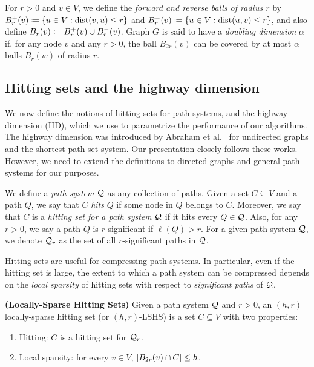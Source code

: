 For $r>0$ and $v\in V$, we define the \emph{forward and reverse balls of radius $r$} by $\Bf_r(v)\defeq\{u\in V: \dist(v,u)\leq r\}$ and $\Bb_r(v)\defeq\{u\in V: \dist(u,v)\leq r\}$, and also define $B_r(v)\defeq\Bf_r(v)\cup\Bb_r(v)$.
Graph $G$ is said to have a \emph{doubling dimension} $\alpha$ if, for any node $v$ and any $r>0$, the ball $B_{2r}(v)$ can be covered by at most $\alpha$ balls $B_r(w)$ of radius $r$. 

\subsection{Hitting sets and the highway dimension}
\label{ssec:hddef}


We now define the notions of hitting sets for path systems, and the highway dimension (HD), which we use to parametrize the performance of our algorithms. The highway dimension was introduced by Abraham et al.~\cite{highway2013,highway2010} for undirected graphs and the shortest-path set system. 
Our presentation closely follows these works.
However, we need to extend the definitions to directed graphs and general path systems for our purposes. 

We define a \emph{path system} $\calQ$ as any collection of paths.
Given a set $C\subseteq V$ and a path $Q$, we say that $C$ \emph{hits} $Q$ if some node in $Q$ belongs to $C$. Moreover, we say that $C$ is a \emph{hitting set for a path system} $\calQ$ if it hits every $Q\in\calQ$. Also, for any $r>0$, we say a path $Q$ is $r$-significant if $\ell(Q)>r$. 
For a given path system $\calQ$, we denote $\calQ_r$ as the set of all $r$-significant paths in $\calQ$.

Hitting sets are useful for compressing path systems. In particular, even if the hitting set is large, the extent to which a path system can be compressed depends on the \emph{local sparsity} of hitting sets with respect to \emph{significant paths} of $\calQ$.

\begin{definition}
	\label{def:lshs}
	\textbf{(Locally-Sparse Hitting Sets)} Given a path system $\calQ$ and $r>0$, an $(h,r)$ locally-sparse hitting set (or $(h,r)$-LSHS) is a set $C\subseteq V$ with two properties: 
	\begin{enumerate}[nosep]
		\item Hitting: $C$ is a hitting set for $\calQ_r$.
		\item Local sparsity: for every $v\in V$, $\abs*{B_{2r}(v)\cap C}\leq h$.
	\end{enumerate}
\end{definition}


